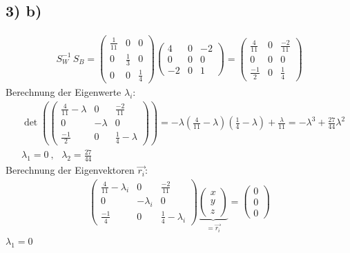 \subsection*{3) b)}
\begin{align*}
  S_W^{-1}\,S_B = \begin{pmatrix} \frac{1}{11}&0&0\\ 0&\frac{1}{3}&0\\ 0&0&\frac{1}{4}\end{pmatrix} \begin{pmatrix} 4&0&-2\\ 0&0&0\\ -2&0&1\end{pmatrix} = \begin{pmatrix} \frac{4}{11}&0&\frac{-2}{11}\\ 0&0&0\\ \frac{-1}{2}&0&\frac{1}{4}\end{pmatrix}
\end{align*}
Berechnung der Eigenwerte $\lambda_i$:
\begin{align*}
  &\det\left(\begin{pmatrix} \frac{4}{11}-\lambda&0&\frac{-2}{11}\\ 0&-\lambda&0\\ \frac{-1}{2}&0&\frac{1}{4}-\lambda\end{pmatrix} \right) = -\lambda\left(\frac{4}{11}-\lambda\right) \left(\frac{1}{4}-\lambda\right) + \frac{\lambda}{11} = -\lambda^3 + \frac{27}{44}\lambda^2 \\
  &\lambda_1 = 0\ , \ \ \ \lambda_2 = \frac{27}{44}
\end{align*}
Berechnung der Eigenvektoren $\vec{r_i}$:
\begin{align*}
  \begin{pmatrix} \frac{4}{11}-\lambda_i&0&\frac{-2}{11}\\ 0&-\lambda_i&0\\ \frac{-1}{4}&0&\frac{1}{4}-\lambda_i\end{pmatrix} \underbrace{\begin{pmatrix} x\\ y\\ z\end{pmatrix}}_{=\vec{r_i}} = \begin{pmatrix} 0\\ 0\\ 0\end{pmatrix}
\end{align*}
$\lambda_1 = 0$

